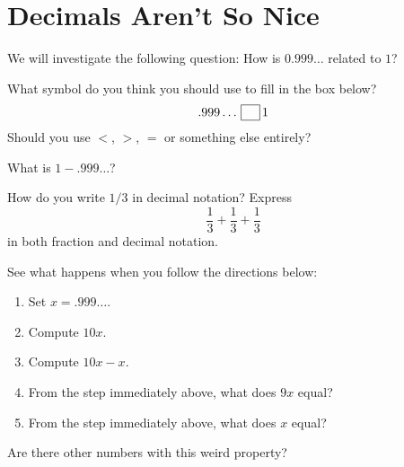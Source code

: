 \newpage
\section{Decimals Aren't So Nice}\label{A:DecNotNice}



We will investigate the following question: How is $0.999\dots$
related to $1$?



\begin{prob}
What symbol do you think you should use to fill in the box below?
\[
.999\dots \,\fbox{\rule[0mm]{0mm}{2mm}\hspace{2ex}}\, 1
\]
Should you use $<$, $>$, $=$ or something else entirely?
\end{prob}


\begin{prob}
What is $1 - .999\dots$?
\end{prob}

\begin{prob}
How do you write $1/3$ in decimal notation? Express
\[
\frac{1}{3} + \frac{1}{3} + \frac{1}{3}
\]
in both fraction and decimal notation.
\end{prob}

\begin{prob}
See what happens when you follow the directions below:
\begin{enumerate}
\item Set $x = .999\dots$.
\item Compute $10x$. 
\item Compute $10x-x$.
\item From the step immediately above, what does $9x$ equal?
\item From the step immediately above, what does $x$ equal?
\end{enumerate}
\end{prob}

\begin{prob}
Are there other numbers with this weird property?
\end{prob}
